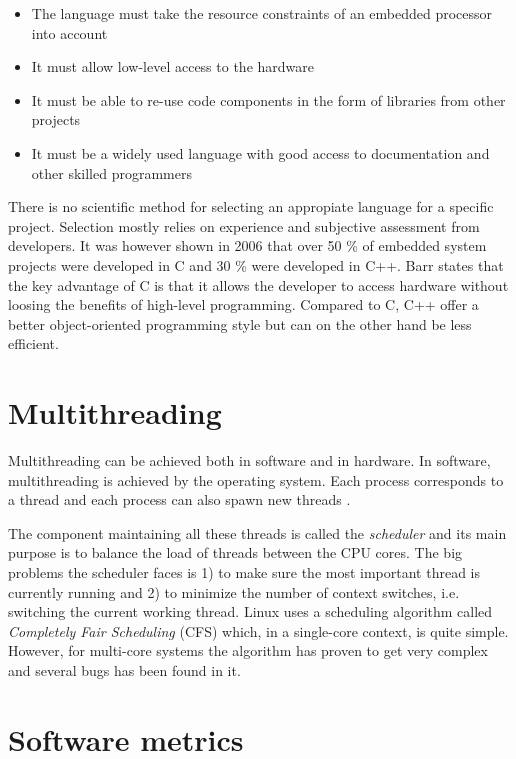 \begin{itemize}
\item
  The language must take the resource constraints of an embedded processor
  into account
\item
  It must allow low-level access to the hardware
\item
  It must be able to re-use code components in the form of libraries from other
    projects
\item
  It must be a widely used language with good access to documentation and other
    skilled programmers
\end{itemize}

There is no scientific method for selecting an appropiate language for a
specific project. Selection mostly relies on experience and subjective
assessment from developers. It was however shown in 2006 that over 50 \% of
embedded system projects were developed in C and 30 \% were developed in C++.
Barr \cite{barr1999programming} states that the key advantage of C is that it
allows the developer to access hardware without loosing the benefits of
high-level programming. Compared to C, C++ offer a better object-oriented
programming style but can on the other hand be less efficient.
\cite{nahas2012choosing}

\section{Multithreading}

Multithreading can be achieved both in software and in hardware. In software,
multithreading is achieved by the operating system. Each process corresponds to
a thread and each process can also spawn new threads
\cite{silberschatz2014operating}.

The component maintaining all these threads is called the \textit{scheduler}
and its main purpose is to balance the load of threads between the CPU cores.
The big problems the scheduler faces is 1) to make sure the most important
thread is currently running and 2) to minimize the number of context switches,
i.e. switching the current working thread. Linux uses a scheduling algorithm
called \textit{Completely Fair Scheduling} (CFS) which, in a single-core
context, is quite simple. However, for multi-core systems the algorithm has
proven to get very complex and several bugs has been found in it.
\cite{lozi2016linux}

\section{Software metrics}

